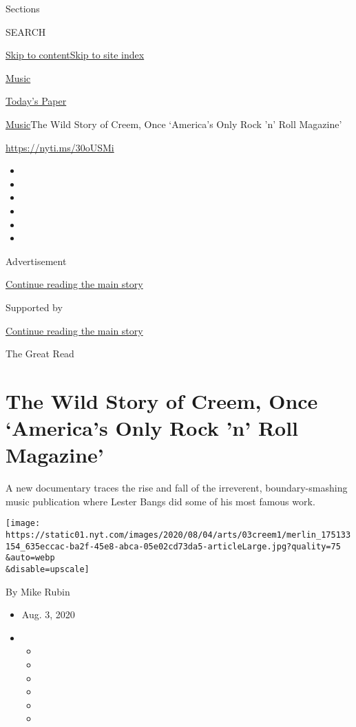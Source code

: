 Sections

SEARCH

\protect\hyperlink{site-content}{Skip to
content}\protect\hyperlink{site-index}{Skip to site index}

\href{https://www.nytimes.com/section/arts/music}{Music}

\href{https://myaccount.nytimes.com/auth/login?response_type=cookie\&client_id=vi}{}

\href{https://www.nytimes.com/section/todayspaper}{Today's Paper}

\href{/section/arts/music}{Music}\textbar{}The Wild Story of Creem, Once
`America's Only Rock 'n' Roll Magazine'

\url{https://nyti.ms/30oUSMi}

\begin{itemize}
\item
\item
\item
\item
\item
\item
\end{itemize}

Advertisement

\protect\hyperlink{after-top}{Continue reading the main story}

Supported by

\protect\hyperlink{after-sponsor}{Continue reading the main story}

The Great Read

\hypertarget{the-wild-story-of-creem-once-americas-only-rock-n-roll-magazine}{%
\section{The Wild Story of Creem, Once `America's Only Rock 'n' Roll
Magazine'}\label{the-wild-story-of-creem-once-americas-only-rock-n-roll-magazine}}

A new documentary traces the rise and fall of the irreverent,
boundary-smashing music publication where Lester Bangs did some of his
most famous work.

\texttt{[image: https://static01.nyt.com/images/2020/08/04/arts/03creem1/merlin\_175133154\_635eccac-ba2f-45e8-abca-05e02cd73da5-articleLarge.jpg?quality=75\\\&auto=webp\\\&disable=upscale]}

By Mike Rubin

\begin{itemize}
\item
  Aug. 3, 2020
\item
  \begin{itemize}
  \item
  \item
  \item
  \item
  \item
  \item
  \end{itemize}
\end{itemize}

